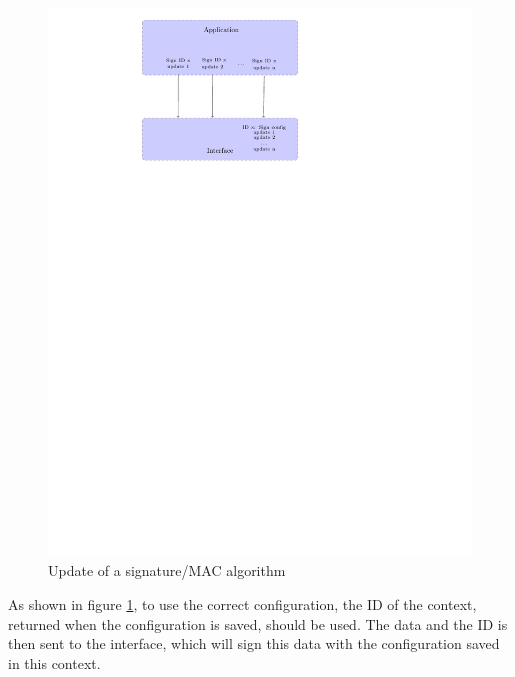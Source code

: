 \begin{figure}[!ht]
\centering
\includegraphics[trim=8cm 20cm 12cm 0cm]{figures/sign_example_update.pdf}
\caption{Update of a signature/MAC algorithm}
\label{fig:gci_sign_update}
\end{figure}

As shown in figure \ref{fig:gci_sign_update}, to use the correct configuration,
the ID of the context, returned when the configuration is saved, should be
used.
The data and the ID is then sent to the interface, which will sign this data
with the configuration saved in this context.


